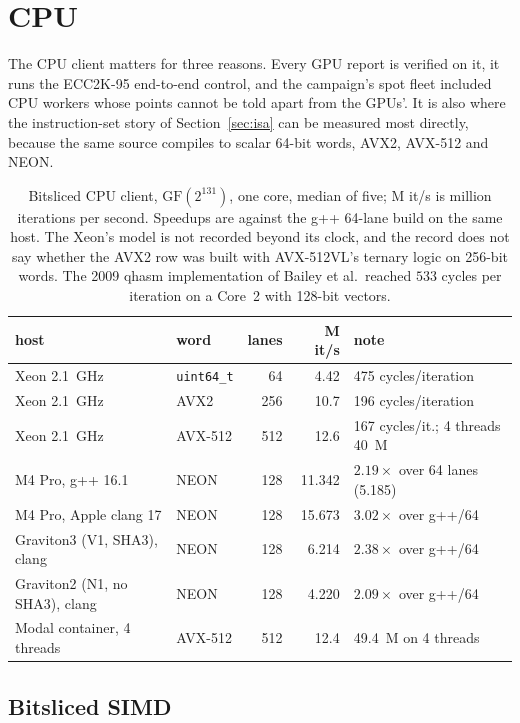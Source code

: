 \section{CPU}
\label{sec:cpu}

The CPU client matters for three reasons. Every GPU report is verified
on it, it runs the ECC2K-95 end-to-end control, and the campaign's spot
fleet included CPU workers whose points cannot be told apart from the
GPUs'. It is also where the instruction-set story of
Section~\ref{sec:isa} can be measured most directly, because the same
source compiles to scalar 64-bit words, AVX2, AVX-512 and NEON.

\begin{table}[t]
\centering
\small
\caption{Bitsliced CPU client, $\mathrm{GF}(2^{131})$, one core, median
  of five; M it/s is million iterations per second. Speedups are against
  the g++ 64-lane build on the same host. The Xeon's model is not
  recorded beyond its clock, and the record does not say whether the
  AVX2 row was built with AVX-512VL's ternary logic on 256-bit words. The 2009 qhasm implementation of Bailey et
  al.\ reached $533$ cycles per iteration on a Core~2 with 128-bit
  vectors.}
\label{tab:cpu}
\begin{tabular}{@{}llrrl@{}}
\toprule
host & word & lanes & M it/s & note \\
\midrule
Xeon 2.1~GHz & \texttt{uint64\_t} & 64 & 4.42 & 475 cycles/iteration \\
Xeon 2.1~GHz & AVX2 & 256 & 10.7 & 196 cycles/iteration \\
Xeon 2.1~GHz & AVX-512 & 512 & 12.6 & 167 cycles/it.; 4 threads 40~M \\
M4 Pro, g++ 16.1 & NEON & 128 & 11.342 & $2.19\times$ over 64 lanes (5.185) \\
M4 Pro, Apple clang 17 & NEON & 128 & 15.673 & $3.02\times$ over g++/64 \\
Graviton3 (V1, SHA3), clang & NEON & 128 & 6.214 & $2.38\times$ over g++/64 \\
Graviton2 (N1, no SHA3), clang & NEON & 128 & 4.220 & $2.09\times$ over g++/64 \\
Modal container, 4 threads & AVX-512 & 512 & 12.4 & 49.4~M on 4 threads \\
\bottomrule
\end{tabular}
\end{table}

\subsection{Bitsliced SIMD}
\label{sec:cpu-bitsliced}

